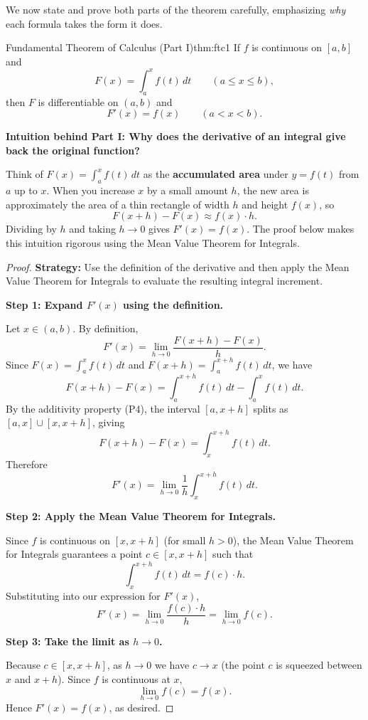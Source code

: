 \vspace{0.5em}

We now state and prove both parts of the theorem carefully, emphasizing \emph{why} each formula takes the form it does.

\begin{theorem}{Fundamental Theorem of Calculus (Part I)}{thm:ftc1}
If $f$ is continuous on $[a,b]$ and
\[
F(x)=\int_a^x f(t)\,dt \qquad (a\le x\le b),
\]
then $F$ is differentiable on $(a,b)$ and
\[
F'(x)=f(x)\qquad (a<x<b).
\]
\end{theorem}

\textbf{Intuition behind Part I: Why does the derivative of an integral give back the original function?}

Think of $F(x)=\int_a^x f(t)\,dt$ as the \textbf{accumulated area} under $y=f(t)$ from $a$ up to $x$. When you increase $x$ by a small amount $h$, the new area is approximately the area of a thin rectangle of width $h$ and height $f(x)$, so
\[
F(x+h)-F(x) \approx f(x)\cdot h.
\]
Dividing by $h$ and taking $h\to 0$ gives $F'(x)=f(x)$. The proof below makes this intuition rigorous using the Mean Value Theorem for Integrals.

\begin{proof}
\textbf{Strategy:} Use the definition of the derivative and then apply the Mean Value Theorem for Integrals to evaluate the resulting integral increment.

\textbf{Step 1: Expand $F'(x)$ using the definition.}

Let $x\in(a,b)$. By definition,
\[
F'(x)=\lim_{h\to 0}\frac{F(x+h)-F(x)}{h}.
\]
Since $F(x)=\int_a^x f(t)\,dt$ and $F(x+h)=\int_a^{x+h} f(t)\,dt$, we have
\[
F(x+h)-F(x) = \int_a^{x+h} f(t)\,dt - \int_a^x f(t)\,dt.
\]
By the additivity property (P4), the interval $[a,x+h]$ splits as $[a,x]\cup[x,x+h]$, giving
\[
F(x+h)-F(x)=\int_x^{x+h} f(t)\,dt.
\]
Therefore
\[
F'(x)=\lim_{h\to 0}\frac{1}{h}\int_x^{x+h} f(t)\,dt.
\]

\textbf{Step 2: Apply the Mean Value Theorem for Integrals.}

Since $f$ is continuous on $[x,x+h]$ (for small $h>0$), the Mean Value Theorem for Integrals guarantees a point $c\in[x,x+h]$ such that
\[
\int_x^{x+h} f(t)\,dt = f(c)\cdot h.
\]
Substituting into our expression for $F'(x)$,
\[
F'(x)=\lim_{h\to 0}\frac{f(c)\cdot h}{h}=\lim_{h\to 0}f(c).
\]

\textbf{Step 3: Take the limit as $h\to 0$.}

Because $c\in[x,x+h]$, as $h\to 0$ we have $c\to x$ (the point $c$ is squeezed between $x$ and $x+h$). Since $f$ is continuous at $x$,
\[
\lim_{h\to 0}f(c)=f(x).
\]
Hence $F'(x)=f(x)$, as desired.
\end{proof}

